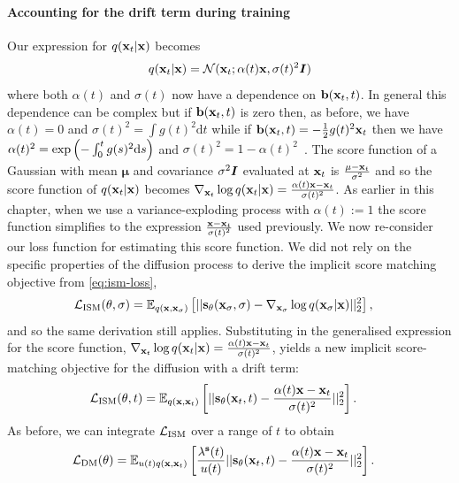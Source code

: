 \paragraph{Accounting for the drift term during training}
Our expression for $q({\mathbf{x}}_t|{\mathbf{x}})$ becomes
\begin{align}
    q({\mathbf{x}}_t|{\mathbf{x}}) = {\mathcal{N}}({\mathbf{x}}_t; \alpha(t){\mathbf{x}}, \sigma(t)^2{\bm{I}})
\end{align}
where both $\alpha(t)$ and $\sigma(t)$ now have a dependence on ${\mathbf{b}}({\mathbf{x}}_t, t)$. In general this dependence can be complex but if ${\mathbf{b}}({\mathbf{x}}_t, t)$ is zero then, as before, we have $\alpha(t) = 0$ and $\sigma(t)^2 = \int g(t)^2 \mathrm{d}t$ while if ${\mathbf{b}}({\mathbf{x}}_t, t) = - \frac{1}{2}g(t)^2{\mathbf{x}}_t$ then we have $\alpha(t)^2 = \text{exp}\left( - \int_0^t g(s)^2 \mathrm{d} s \right)$ and $\sigma(t)^2 = 1 - \alpha(t)^2$~\citep{song2020score}. The score function of a Gaussian with mean $\mathbf{\mu}$ and covariance $\sigma^2{\bm{I}}$ evaluated at ${\mathbf{x}}_t$ is $\frac{\mathbf{\mu} - {\mathbf{x}}_t}{\sigma^2}$ and so the score function of $q({\mathbf{x}}_t|{\mathbf{x}})$ becomes $\nabla_{{\mathbf{x}}_t} \log q({\mathbf{x}}_t|{\mathbf{x}}) = \frac{\alpha(t){\mathbf{x}} - {\mathbf{x}}_t}{\sigma(t)^2}$. As earlier in this chapter, when we use a variance-exploding process with $\alpha(t) := 1$ the score function simplifies to the expression $\frac{{\mathbf{x}}-{\mathbf{x}}_t}{\sigma(t)^2}$ used previously. We now re-consider our loss function for estimating this score function. We did not rely on the specific properties of the diffusion process to derive the implicit score matching objective from \cref{eq:ism-loss},
\begin{align} \label{eq:ism-loss-with-drift}
    \mathcal{L}_\text{ISM}(\theta, \sigma) &= \mathbb{E}_{q({\mathbf{x}}, {\mathbf{x}}_\sigma)} \left[ 
    || {\mathbf{s}}_\theta({\mathbf{x}}_\sigma, \sigma) - \nabla_{{\mathbf{x}}_\sigma} \log q({\mathbf{x}}_\sigma|{\mathbf{x}}) ||_2^2 \right],
\end{align}
and so the same derivation still applies. Substituting in the generalised expression for the score function, $\nabla_{{\mathbf{x}}_t} \log q({\mathbf{x}}_t|{\mathbf{x}}) = \frac{\alpha(t){\mathbf{x}} - {\mathbf{x}}_t}{\sigma(t)^2}$, yields a new implicit score-matching objective for the diffusion with a drift term:
\begin{align}
    \mathcal{L}_\text{ISM}(\theta, t) &= \mathbb{E}_{q({\mathbf{x}}, {\mathbf{x}}_t)} \left[ || {\mathbf{s}}_\theta({\mathbf{x}}_t, t) - \frac{\alpha(t){\mathbf{x}} - {\mathbf{x}}_t}{\sigma(t)^2} ||_2^2 \right].
\end{align}
As before, we can integrate ${\mathcal{L}}_\text{ISM}$ over a range of $t$ to obtain
\begin{align} \label{eq:general-dm-loss}
    \mathcal{L}_\text{DM}(\theta) &= \mathbb{E}_{u(t)q({\mathbf{x}}, {\mathbf{x}}_t)} \left[ \frac{\lambda^{\mathbf{s}}(t)}{u(t)} || {\mathbf{s}}_\theta({\mathbf{x}}_t, t) - \frac{\alpha(t) {\mathbf{x}}-{\mathbf{x}}_t}{\sigma(t)^2} ||_2^2 \right].
\end{align}
